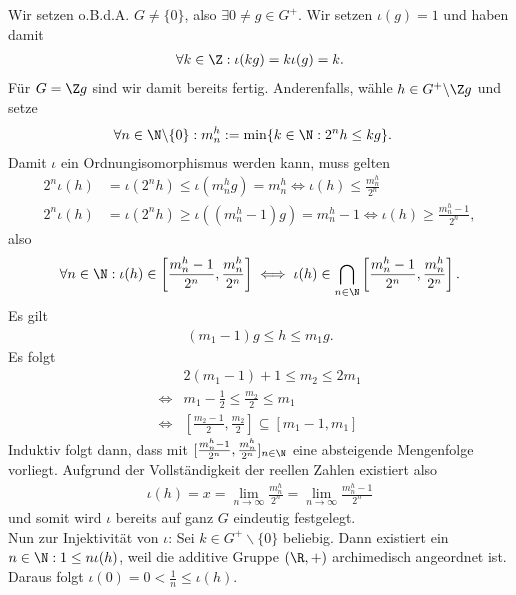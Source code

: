 \begin{solution}
Wir setzen o.B.d.A. $G \neq \{0\}$, also $\exists 0 \neq g \in G^+$.
Wir setzen $\iota(g) = 1$ und haben damit
\begin{align*}
  \forall k \in \Z: \iota(kg) = k\iota(g) = k.
\end{align*}
Für $G = \Z g$ sind wir damit bereits fertig.
Anderenfalls, wähle $h \in G^+\backslash \Z g$ und setze
\begin{align*}
  \forall n \in \N\backslash \{0\}: m_n^h &:= \min\{k \in \N: 2^nh \leq kg\}.
\end{align*}
Damit $\iota$ ein Ordnungisomorphismus werden kann, muss gelten
\begin{align*}
  2^n \iota(h) &= \iota(2^nh) \leq \iota(m_n^hg) = m_n^h \iff \iota(h) \leq \frac{m_n^h}{2^n} \\
  2^n \iota(h) &= \iota(2^nh) \geq \iota((m_n^h - 1)g) = m_n^h - 1 \iff \iota(h) \geq \frac{m_n^h - 1}{2^n},
\end{align*}
also
\begin{align*}
  \forall n \in \N: \iota(h) \in \left[\frac{m_n^h-1}{2^n},\frac{m_n^h}{2^n}\right]
  \iff \iota(h) \in \bigcap_{n \in \N} \left[\frac{m_n^h-1}{2^n},\frac{m_n^h}{2^n}\right].
\end{align*}
Es gilt
\begin{align*}
  (m_1 - 1)g \leq h \leq m_1g.
\end{align*}
Es folgt
\begin{align*}
  &2(m_1 - 1) + 1 \leq m_2 \leq  2m_1 \\
  \iff &m_1 - \frac{1}{2} \leq \frac{m_2}{2} \leq m_1 \\
  \iff &\left[\frac{m_2-1}{2},\frac{m_2}{2}\right] \subseteq \left[m_1 -1,m_1\right]
\end{align*}
Induktiv folgt dann, dass mit $[\frac{m_n^h-1}{2^n},\frac{m_n^h}{2^n}]_{n \in \N}$
eine absteigende Mengenfolge vorliegt.
Aufgrund der Vollständigkeit der reellen Zahlen existiert also
\begin{align*}
  \iota(h) = x = \lim_{n \rightarrow \infty} \frac{m_n^h}{2^n} = \lim_{n \rightarrow \infty} \frac{m_n^h-1}{2^n}
\end{align*}
und somit wird $\iota$ bereits auf ganz $G$ eindeutig festgelegt. \\
Nun zur Injektivität von $\iota$: Sei $k \in G^+\backslash\{0\}$ beliebig.
Dann existiert ein $n \in \N: 1 \leq n\iota(h)$, weil die additive Gruppe $(\R,+)$
archimedisch angeordnet ist. Daraus folgt $\iota(0) = 0 < \frac{1}{n} \leq \iota(h)$.

\end{solution}
